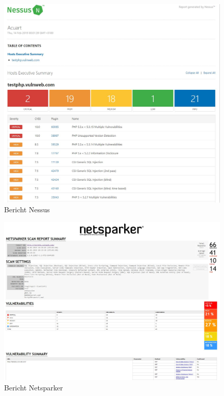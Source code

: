 \documentclass[12pt,oneside,a4paper,parskip,pointlessnumbers]{scrbook}
\begin{document}
  \begin{figure}[htb!]
    \centering
      \includegraphics[width=1\textwidth]{Images/ScrNessus}
    \caption[Bericht Nessus]{Bericht Nessus}
  \end{figure}
  \begin{figure}[htb!]
    \centering
      \includegraphics[width=1\textwidth]{Images/ScrNetsparker}
    \caption[Bericht Netsparker]{Bericht Netsparker}
  \end{figure}
\end{document}
